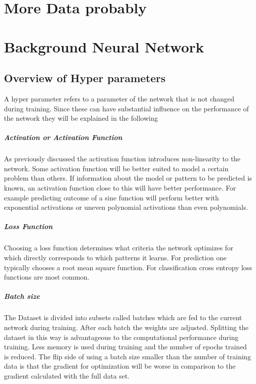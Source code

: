 \appendix
\chapter{More Data probably}
\chapter{Background Neural Network}
	\section{Overview of Hyper parameters}
	A hyper parameter refers to a parameter of the network that is not changed during training. Since these can have substantial influence on the performance of the network they will be explained in the following
		\paragraph{Activation or Activation Function}
			As previously discussed the activation function introduces non-linearity to the network. Some activation function will be better suited to model a certain problem than others. If information about the model or pattern to be predicted is known, an activation function close to this will have better performance. For example predicting outcome of a sine function will perform better with exponential activations or uneven polynomial activations than even polynomials.%
		\paragraph{Loss Function}
			Choosing a loss function determines what criteria the network optimizes for which directly corresponds to which patterns it learns. For prediction one typically chooses a root mean square function. For classification cross entropy loss functions are most common.
		\paragraph{Batch size}
			The Dataset is divided into subsets called batches which are fed to the current network during training. After each batch the weights are adjusted. Splitting the dataset in this way is advantageous to the computational performance during training. Less memory is used during training and the number of epochs trained is reduced. The flip side of using a batch size smaller than the number of training data is that the gradient for optimization will be worse in comparison to the gradient calculated with the full data set. 
